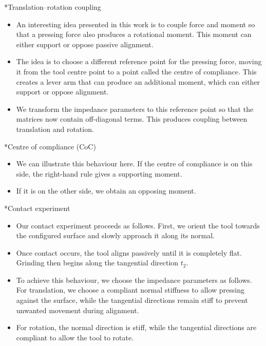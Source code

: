 \documentclass[12pt,a4paper]{article}
\makeatletter
\renewcommand\section{\@startsection{section}{1}{0pt}{14pt}{6pt}{\normalfont\Large\bfseries\color{navy}}}
\makeatother
\begin{document}
\section*{Translation–rotation coupling}
\begin{itemize}
\item An interesting idea presented in this work is to couple force and moment so that a pressing force also produces a rotational moment. This moment can either support or oppose passive alignment.
\item The idea is to choose a different reference point for the pressing force, moving it from the tool centre point to a point called the centre of compliance. This creates a lever arm that can produce an additional moment, which can either support or oppose alignment.
\item We transform the impedance parameters to this reference point so that the matrices now contain off-diagonal terms. This produces coupling between translation and rotation.
\end{itemize}

\section*{Centre of compliance (CoC)}
\begin{itemize}
\item We can illustrate this behaviour here. If the centre of compliance is on this side, the right-hand rule gives a supporting moment.
\item If it is on the other side, we obtain an opposing moment.
\end{itemize}

\section*{Contact experiment}
\begin{itemize}
\item Our contact experiment proceeds as follows. First, we orient the tool towards the configured surface and slowly approach it along its normal.
\item Once contact occurs, the tool aligns passively until it is completely flat. Grinding then begins along the tangential direction \(t_2\).
\item To achieve this behaviour, we choose the impedance parameters as follows. For translation, we choose a compliant normal stiffness to allow pressing against the surface, while the tangential directions remain stiff to prevent unwanted movement during alignment.
\item For rotation, the normal direction is stiff, while the tangential directions are compliant to allow the tool to rotate.
\end{itemize}
\end{document}
